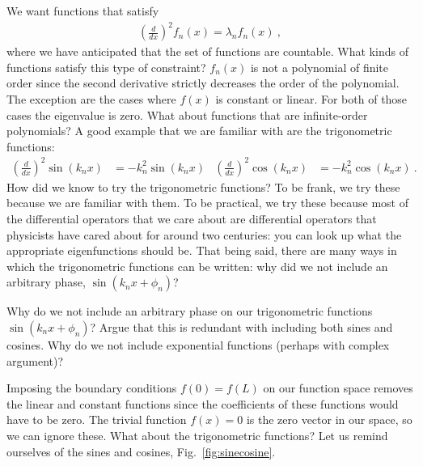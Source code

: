 \documentclass[12pt, oneside]{report}    %
\begin{document}
We want functions that satisfy
\begin{align}
    \left(\frac{d}{dx}\right)^2f_n(x) = \lambda_n f_n(x) \ ,
\end{align}
where we have anticipated that the set of functions are countable. What kinds of functions satisfy this type of constraint? $f_n(x)$ is not a polynomial of finite order since the second derivative strictly decreases the order of the polynomial. The exception are the cases where $f(x)$ is constant or linear. For both of those cases the eigenvalue is zero. What about functions that are infinite-order polynomials? A good example that we are familiar with are the trigonometric functions:
\begin{align}
    \left(\frac{d}{dx}\right)^2\sin(k_nx) &=
    -k_n^2\sin(k_n x)
    &
    \left(\frac{d}{dx}\right)^2\cos(k_nx) &=
    -k_n^2\cos(k_n x) \ .
\end{align}
How did we know to try the trigonometric functions? To be frank, we try these because we are familiar with them. To be practical, we try these because most of the differential operators that we care about are differential operators that physicists have cared about for around two centuries: you can look up what the appropriate eigenfunctions should be. That being said, there are many ways in which the trigonometric functions can be written: why did we not include an arbitrary phase, $\sin(k_nx+\phi_n)$? 
\begin{exercise}
Why do we not include an arbitrary phase on our trigonometric functions $\sin(k_nx+\phi_n)$? Argue that this is redundant with including both sines and cosines. Why do we not include exponential functions (perhaps with complex argument)?
\end{exercise}
Imposing the boundary conditions $f(0)=f(L)$ on our function space removes the linear and constant functions since the coefficients of these functions would have to be zero. The trivial function $f(x)=0$ is the zero vector in our space, so we can ignore these. What about the trigonometric functions? Let us remind ourselves of the sines and cosines, Fig.~\ref{fig:sinecosine}. 
\end{document}
